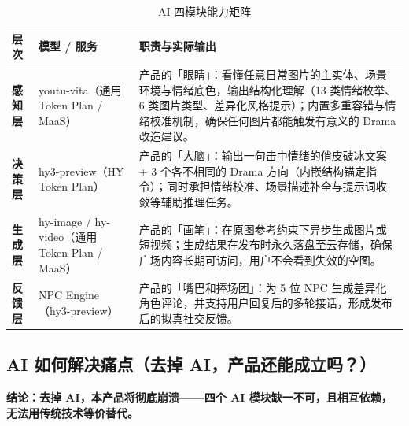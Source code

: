 \documentclass[10pt, a4paper]{article}
\newcommand{\kw}[1]{\textbf{#1}}
\begin{document}
\vspace{4pt}
\begin{table}[htbp]
  \centering
  \caption{AI 四模块能力矩阵}
  \label{tab:ai}
  \renewcommand{\arraystretch}{1.4}
  \newcommand{\tmod}[1]{{\ttfamily\color{TokenPurple}#1}}
  \begin{tabularx}{\linewidth}{>{\bfseries}p{1.4cm} p{3.5cm} X}
    \toprule
    层次 & 模型 / 服务 & 职责与实际输出 \\
    \midrule
    \vspace{4pt}感知层
      & \tmod{youtu-vita}\newline（通用 Token Plan / MaaS）
      & 产品的「眼睛」：看懂任意日常图片的主实体、场景环境与情绪底色，输出结构化理解（13 类情绪枚举、6 类图片类型、差异化风格提示）；内置多重容错与情绪校准机制，确保任何图片都能触发有意义的 Drama 改造建议。 \\
    \addlinespace[3pt]
    \vspace{4pt}决策层
      & \tmod{hy3-preview}\newline（HY Token Plan）
      & 产品的「大脑」：输出一句击中情绪的俏皮破冰文案 + 3 个各不相同的 Drama 方向（内嵌结构锚定指令）；同时承担情绪校准、场景描述补全与提示词收敛等辅助推理任务。 \\
    \addlinespace[3pt]
    \vspace{4pt}生成层
      & \tmod{hy-image} / \tmod{hy-video}\newline（通用 Token Plan / MaaS）
      & 产品的「画笔」：在原图参考约束下异步生成图片或短视频；生成结果在发布时永久落盘至云存储，确保广场内容长期可访问，用户不会看到失效的空图。 \\
    \addlinespace[3pt]
    \vspace{4pt}反馈层
      & \tmod{NPC Engine}\newline（hy3-preview）
      & 产品的「嘴巴和捧场团」：为 5 位 NPC 生成差异化角色评论，并支持用户回复后的多轮接话，形成发布后的拟真社交反馈。 \\
    \bottomrule
  \end{tabularx}
\end{table}

\subsection{AI 如何解决痛点（去掉 AI，产品还能成立吗？）}

\begin{tcolorbox}[dramabox]
  \kw{结论：去掉 AI，本产品将彻底崩溃——四个 AI 模块缺一不可，且相互依赖，无法用传统技术等价替代。}
\end{tcolorbox}
\end{document}
